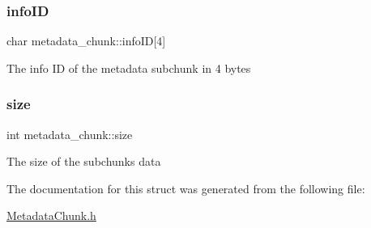 \subsubsection{\texorpdfstring{info\+ID}{infoID}}
{\footnotesize\ttfamily char metadata\+\_\+chunk\+::info\+ID\mbox{[}4\mbox{]}}

The info ID of the metadata subchunk in 4 bytes \mbox{\label{structmetadata__chunk_ab35474f8e23bc06b567838a1d1394445}} 
\subsubsection{\texorpdfstring{size}{size}}
{\footnotesize\ttfamily int metadata\+\_\+chunk\+::size}

The size of the subchunk\textquotesingle{}s data 

The documentation for this struct was generated from the following file\+:\begin{DoxyCompactItemize}
\item 
\hyperlink{MetadataChunk_8h}{Metadata\+Chunk.\+h}\end{DoxyCompactItemize}
